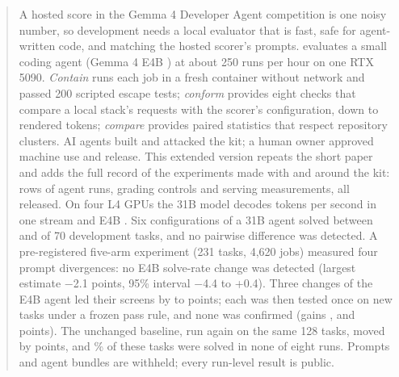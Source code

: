 \begin{abstract}
A hosted score in the Gemma 4 Developer Agent competition \citep{googledeepmind2026competition} is one noisy number, so
development needs a local evaluator that is fast, safe for agent-written code, and matching the hosted scorer's prompts.
\kit{} evaluates a small coding agent (Gemma 4 E4B \citep{gemmateam2026gemma4}) at about 250 runs per hour on one RTX
5090. \emph{Contain} runs each job in a fresh container without network and passed 200 scripted escape tests;
\emph{conform} provides eight checks that compare a local stack's requests with the scorer's configuration, down to
rendered tokens; \emph{compare} provides paired statistics that respect repository clusters. AI agents built and attacked
the kit; a human owner approved machine use and release. This extended version repeats the short paper and adds the full
record of the experiments made with and around the kit: \AllAgentRows{} rows of agent runs, \ControlRows{} grading
controls and \ServeRows{} serving measurements, all released. On four L4 GPUs the 31B model decodes \ServeBigOne{}
tokens per second in one stream and E4B \ServeSmallOne. Six configurations of a 31B agent solved between
\PubMinSeventy{} and \PubMaxSeventy{} of 70 development tasks, and no pairwise difference was detected. A pre-registered
five-arm experiment (231 tasks, 4,620 jobs) measured four prompt divergences: no E4B solve-rate change was detected
(largest estimate $-$2.1 points, 95\% interval $-$4.4 to +0.4). Three changes of the E4B agent led their screens by
\LeadTwo{} to \LeadOne{} points; each was then tested once on new tasks under a frozen pass rule, and none was
confirmed (gains \GainOne, \GainTwo{} and \GainThree{} points). The unchanged baseline, run again on the same 128 tasks,
moved by \RepeatHDiff{} points, and \HNeverPct\% of these tasks were solved in none of eight runs. Prompts and agent
bundles are withheld; every run-level result is public.
\end{abstract}
